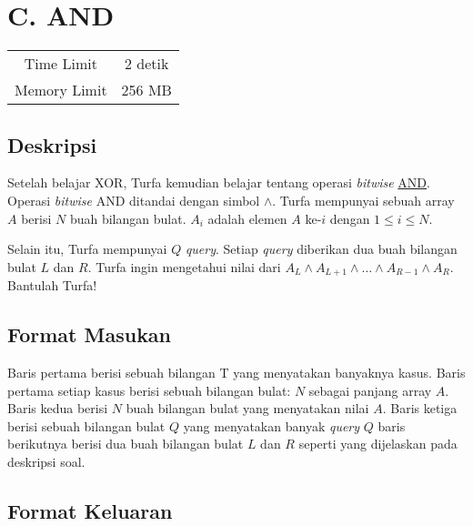 \documentclass{article}
\begin{document}
\section*{\hfil C. AND\hfil}

\begin{center}
\begin{tabular}{ |cc| } 
 \hline
 Time Limit & 2 detik \\ 
 Memory Limit & 256 MB \\
 \hline
\end{tabular}
\end{center}

\subsection*{Deskripsi}
\par Setelah belajar XOR, Turfa kemudian belajar tentang operasi \textit{bitwise} \href{https://en.wikipedia.org/wiki/Bitwise_operation#AND}{AND}. Operasi \textit{bitwise} AND ditandai dengan simbol $\land$. Turfa mempunyai sebuah array $A$ berisi $N$ buah bilangan bulat. $A_{i}$ adalah elemen $A$ ke-$i$ dengan $1 \leq i \leq N$.
\par Selain itu, Turfa mempunyai $Q$ \textit{query}. Setiap \textit{query} diberikan dua buah bilangan bulat $L$ dan $R$. Turfa ingin mengetahui nilai dari $A_{L} \land A_{L+1} \land \dots \land A_{R-1} \land A_{R}$. Bantulah Turfa!

\subsection*{Format Masukan}
\par Baris pertama berisi sebuah bilangan T yang menyatakan banyaknya kasus.
\newline Baris pertama setiap kasus berisi sebuah bilangan bulat: $N$ sebagai panjang array $A$.
\newline Baris kedua berisi $N$ buah bilangan bulat yang menyatakan nilai $A$.
\newline Baris ketiga berisi sebuah bilangan bulat $Q$ yang menyatakan banyak \textit{query}
\newline $Q$ baris berikutnya berisi dua buah bilangan bulat $L$ dan $R$ seperti yang dijelaskan pada deskripsi soal.

\subsection*{Format Keluaran}
\end{document}
